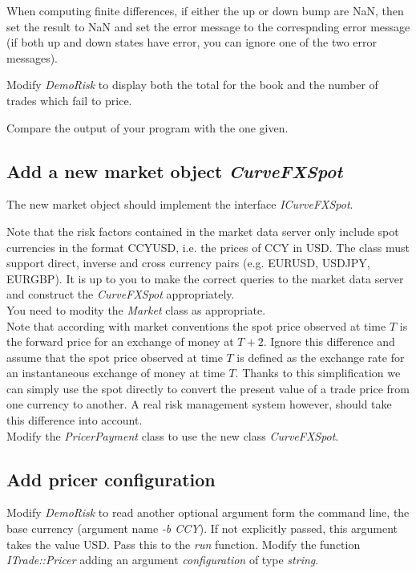 \documentclass[10pt]{article}
\begin{document}
When computing finite differences, if either the up or down bump are NaN, then set the result to NaN and set the error message to the correspnding error message (if both up and down states have error, you can ignore one of the two error messages).

Modify \textit{DemoRisk} to display both the total for the book and the number of trades which fail to price.

Compare the output of your program with the one given.

\subsection{Add a new market object \textit{CurveFXSpot}}
\label{sec:fxspot}
The new market object should implement the interface \textit{ICurveFXSpot}.

Note that the risk factors contained in the market data server only include spot currencies in the format CCYUSD, i.e. the prices of CCY in USD. The class must support direct, inverse and cross currency pairs (e.g. EURUSD, USDJPY, EURGBP). It is up to you to make the correct queries to the market data server and construct the \textit{CurveFXSpot} appropriately.\\

You need to modity the \textit{Market} class as appropriate.\\

Note that according with market conventions the spot price observed at time $T$ is the forward price for an exchange of money at $T+2$. Ignore this difference and assume that the spot price observed at time $T$ is defined as the exchange rate for an instantaneous exchange of money at time $T$. Thanks to this simplification we can simply use the spot directly to convert the present value of a trade price from one currency to another. A real risk management system however, should take this difference into account.\\

Modify the \textit{PricerPayment} class to use the new class \textit{CurveFXSpot}.

\subsection{Add pricer configuration}
Modify \textit{DemoRisk} to read another optional argument form the command line, the base currency (argument name \textit{-b CCY}). If not explicitly passed, this argument takes the value USD. Pass this to the \textit{run} function.
Modify the function \textit{ITrade::Pricer} adding an argument \textit{configuration} of type \textit{string}.
\end{document}
